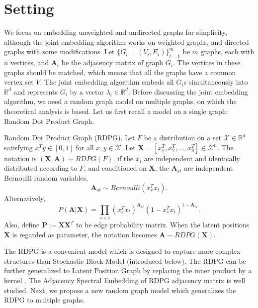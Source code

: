 \documentclass[10pt,journal,compsoc]{IEEEtran}
\newenvironment{definition}[1][Definition]{\begin{trivlist}
		\item[\hskip \labelsep {\bfseries #1}]}{\end{trivlist}}
\newcommand{\bA}{\mathbf{A}}
\newcommand{\bX}{\mathbf{X}}
\newcommand{\bP}{\mathbf{P}}
\begin{document}
\section{Setting}
We focus on embedding unweighted and undirected graphs for simplicity, although the joint embedding algorithm works on weighted graphs, and directed graphs with some modifications.  Let $\{G_i=(V_i,E_i)\} _{i=1}^{m}$ be $m$ graphs, each with $n$ vertices, and $\bA _i$ be the adjacency matrix of graph $G_i$. The vertices in these graphs should be matched, which means that all the graphs have a common vertex set $V$. The joint embedding algorithm embeds all $G_i$s simultaneously into $\mathbb{R}^d$ and represents $G_i$  by a vector $\lambda_i \in \mathbb{R}^d$. Before discussing the joint embedding algorithm, we need a random graph model on multiple graphs, on which the theoretical analysis is based. Let us first recall a model on a single graph: Random Dot Product Graph\cite{young2007random}. 

\begin{definition} Random Dot Product Graph (RDPG). Let $F$ be a distribution on a set $\mathcal{X} \in \mathbb{R}^d$ satisfying $x^T y \in [0, 1]$ for all $x, y \in \mathcal{X}$. Let $\bX=[x_1^T,x_2^T,...,x_n^T] \in \mathcal{X}^n$. The notation is $(\bX,\bA) \sim RDPG(F)$, if the $x_i$ are independent and identically distributed according to $F$, and conditioned on $\bX$, the $\bA_{st}$ are independent Bernoulli random variables,
	\[ \bA_{st} \sim Bernoulli(x_s^T x_t). \]
	Alternatively,
	\[ P(\bA|\bX) = \prod_{s<t} (x_s^T x_t) ^{ \bA_{st}} (1-x_s^T x_t)^{1- \bA_{st}}.\]
	Also, define $\bP:=\bX\bX^T$ to be edge probability matrix. When the latent positions $\bX$ is regarded as parameter, the notation becomes $\bA \sim RDPG(\bX)$.
\end{definition}
The RDPG is a convenient model which is designed to capture more complex structures than Stochastic Block Model (introduced below). The RDPG can be further generalized to Latent Position Graph by replacing the inner product by a kernel \cite{tang2013universally}. The Adjacency Spectral Embedding of RDPG adjacency matrix is well studied\cite{sussman2014consistent}. Next, we propose a new random graph model which generalizes the RDPG to multiple graphs.
\end{document}
